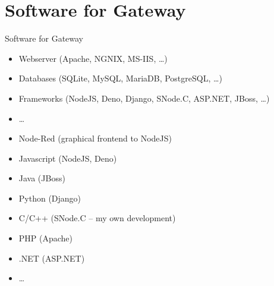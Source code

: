 ﻿\section[nosectionpage]{Software for Gateway}

\begin{frame}{Software for Gateway}
  \begin{description}[Languages]
    \item[Tools]
    \begin{itemize}
      \item Webserver (Apache, NGNIX, MS-IIS, \ldots)
      \item Databases (SQLite, MySQL, \alert<2>{MariaDB}, PostgreSQL, \ldots)
      \item Frameworks (\alert<2>{NodeJS}, Deno, Django, \alert<2>{SNode.C}, ASP.NET, JBoss, \ldots)
      \item \ldots
    \end{itemize}
    \item[Languages]
    \begin{itemize}
      \item \alert<2>{Node-Red (graphical frontend to NodeJS)}
      \item \alert<2>{Javascript} (\alert<2>{NodeJS}, Deno)
      \item Java (JBoss)
      \item Python (Django)
      \item \alert<2>{C/C++ (SNode.C -- my own development)}
      \item PHP (Apache)
      \item .NET (ASP.NET)
      \item \ldots
    \end{itemize}
  \end{description}
\end{frame}
